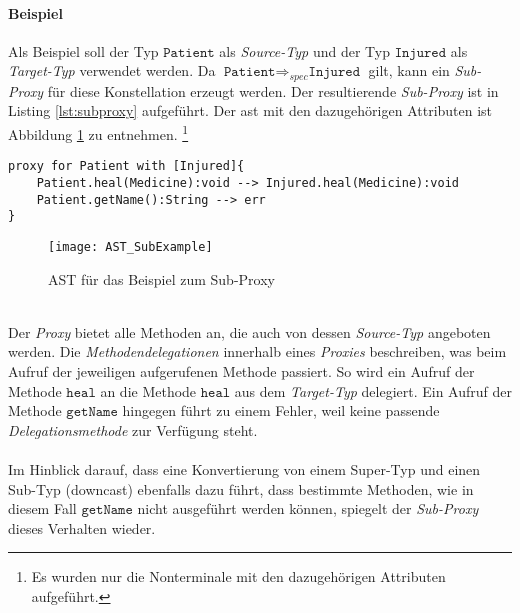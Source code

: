 \paragraph{Beispiel}
Als Beispiel soll  der Typ $\texttt{Patient}$ als \emph{Source-Typ} und der Typ $\texttt{Injured}$ als \emph{Target-Typ} verwendet werden. Da $\texttt{Patient} \Rightarrow_{spec} \texttt{Injured}$ gilt, kann ein \emph{Sub-Proxy} für diese Konstellation erzeugt werden. Der resultierende \emph{Sub-Proxy} ist in Listing \ref{lst:subproxy} aufgeführt. Der \acrshort{ast} mit den dazugehörigen Attributen ist Abbildung \ref{fig:ASTSUB} zu entnehmen. \footnote{Es wurden nur die Nonterminale mit den dazugehörigen Attributen aufgeführt.}
\begin{lstlisting}[style = dsl, caption = Sub-Proxy für Patient, captionpos = b, label = lst:subproxy]
proxy for Patient with [Injured]{
	Patient.heal(Medicine):void --> Injured.heal(Medicine):void
	Patient.getName():String --> err
}
\end{lstlisting}
\noindent
\begin{figure}[h!]
\texttt{[image: AST\_SubExample]}
\caption{AST für das Beispiel zum Sub-Proxy}
\label{fig:ASTSUB}
\end{figure}
\noindent
\\
Der \emph{Proxy} bietet alle Methoden an, die auch von dessen \emph{Source-Typ} angeboten werden. Die \emph{Methodendelegationen} innerhalb eines \emph{Proxies} beschreiben, was beim Aufruf der jeweiligen aufgerufenen Methode passiert. So wird ein Aufruf der Methode $\texttt{heal}$ an die Methode $\texttt{heal}$ aus dem \emph{Target-Typ} delegiert. Ein Aufruf der Methode $\texttt{getName}$ hingegen führt zu einem Fehler, weil keine passende \emph{Delegationsmethode} zur Verfügung steht.
\\\\
Im Hinblick darauf, dass eine Konvertierung von einem Super-Typ und einen Sub-Typ (\Gls{downcast}) ebenfalls dazu führt, dass bestimmte Methoden, wie in diesem Fall $\texttt{getName}$ nicht ausgeführt werden können, spiegelt der \emph{Sub-Proxy} dieses Verhalten wieder.
